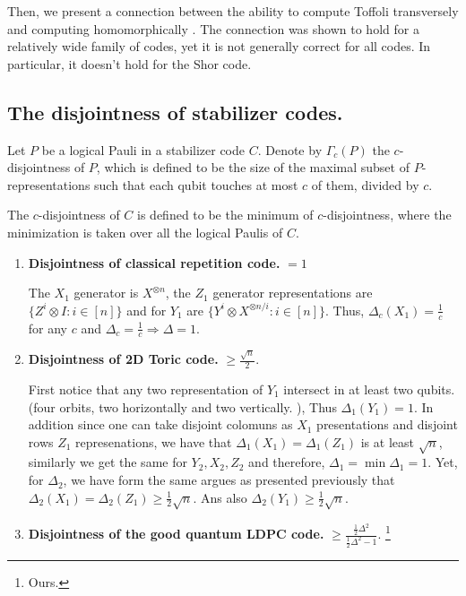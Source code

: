 \documentclass[manuscript,screen,review]{acmart}
\begin{document}
{Then, we present a connection between the ability to compute Toffoli transversely and computing homomorphically \cite{newman2017limitationstransversalcomputationquantum}. The connection was shown to hold for a relatively wide family of codes, yet it is not generally correct for all codes. In particular, it doesn't hold for the Shor code.
  \subsection{The disjointness of stabilizer codes.} 

   
\newcommand{\Disc}{ \frac{ \frac{1}{2} \Delta^{2} }{\frac{1}{2} \Delta^{2} - 1  } } 

\begin{definition}
Let $P$ be a logical Pauli in a stabilizer code $C$. Denote by $\Gamma_{c}(P)$ the $c$-disjointness of $P$, which is defined to be the size of the maximal subset of $P$-representations such that each qubit touches at most $c$ of them, divided by $c$. 


The $c$-disjointness of $C$ is defined to be the minimum of $c$-disjointness, where the minimization is taken over all the logical Paulis of $C$.
\end{definition}

\newpage

\newpage

\begin{enumerate}
  \item \textbf{Disjointness of classical repetition code.} $ = 1$ 


    The $X_{1}$ generator is $X^{\otimes n}$, the $Z_{1}$ generator representations are $ \{ Z^{i} \otimes I : i \in [n] \} $ and for $Y_{1}$ are  $ \{ Y^{i} \otimes X^{\otimes n/i }  : i \in [n]  \}  $. Thus, $\Delta_{c}(X_{1}) = \frac{1}{c}$ for any $c$ and $\Delta_{c} = \frac{1}{c} \Rightarrow \Delta = 1$.
  \item \textbf{Disjointness of 2D Toric code.} $\ge \frac{\sqrt{n}}{2}$. 

    First notice that any two representation of $Y_{1}$ intersect in at least two qubits. (four orbits, two horizontally and two vertically. ), Thus $\Delta_{1}\left( Y_{1} \right) = 1$. In addition since one can take disjoint colomuns as $X_{1}$ presentations and disjoint rows $Z_{1}$ represenations, we have that $\Delta_{1}(X_1) = \Delta_{1}(Z_1)$ is at least $\sqrt{n}$, similarly we get the same for $Y_{2},X_{2},Z_{2}$ and therefore, $\Delta_{1} = \min\Delta_{1} = 1$. 
    Yet, for $\Delta_{2}$, we have form the same argues as presented previously that $\Delta_{2}(X_{1}) = \Delta_{2}(Z_{1}) \ge \frac{1}{2}\sqrt{n}$. Ans also $\Delta_{2}(Y_{1}) \ge \frac{1}{2}\sqrt{n}$.    
  \item \textbf{Disjointness of the good quantum LDPC code.} $ \ge \Disc$. \footnote{Ours.}


\end{enumerate}}
\end{document}
